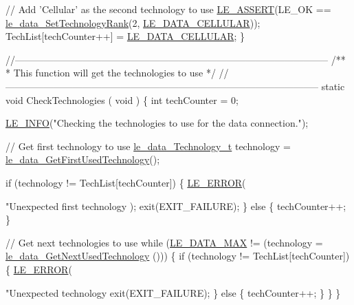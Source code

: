 \begin{DoxyCodeInclude}
{    \textcolor{comment}{// Add 'Cellular' as the second technology to use}
    \hyperlink{le__log_8h_ac0dbbef91dc0fed449d0092ff0557b39}{LE\_ASSERT}(LE\_OK == \hyperlink{le__data__interface_8h_aeb5f71861d30b8442b2c11ca34bc73c4}{le\_data\_SetTechnologyRank}(2, 
      \hyperlink{le__data__interface_8h_a245d12b4d3367d81c0fc8b76fa60674aaaa3c712c673bf5a353beba020c415a5f}{LE\_DATA\_CELLULAR}));
    TechList[techCounter++] = \hyperlink{le__data__interface_8h_a245d12b4d3367d81c0fc8b76fa60674aaaa3c712c673bf5a353beba020c415a5f}{LE\_DATA\_CELLULAR};
\}

\textcolor{comment}{//--------------------------------------------------------------------------------------------------}\textcolor{comment}{}
\textcolor{comment}{/**}
\textcolor{comment}{ *  This function will get the technologies to use}
\textcolor{comment}{ */}
\textcolor{comment}{//--------------------------------------------------------------------------------------------------}
\textcolor{keyword}{static} \textcolor{keywordtype}{void} CheckTechnologies
(
    \textcolor{keywordtype}{void}
)
\{
    \textcolor{keywordtype}{int} techCounter = 0;

    \hyperlink{le__log_8h_a23e6d206faa64f612045d688cdde5808}{LE\_INFO}(\textcolor{stringliteral}{"Checking the technologies to use for the data connection."});

    \textcolor{comment}{// Get first technology to use}
    \hyperlink{le__data__interface_8h_a245d12b4d3367d81c0fc8b76fa60674a}{le\_data\_Technology\_t} technology = 
      \hyperlink{le__data__interface_8h_affc9e22694ddee1141983129f6e29837}{le\_data\_GetFirstUsedTechnology}();

    \textcolor{keywordflow}{if} (technology != TechList[techCounter])
    \{
        \hyperlink{le__log_8h_a353590f91b3143a7ba3a416ae5a50c3d}{LE\_ERROR}(\textcolor{stringliteral}{"Unexpected first technology %
      );
        exit(EXIT\_FAILURE);
    \}
    \textcolor{keywordflow}{else}
    \{
        techCounter++;
    \}

    \textcolor{comment}{// Get next technologies to use}
    \textcolor{keywordflow}{while} (\hyperlink{le__data__interface_8h_a245d12b4d3367d81c0fc8b76fa60674aa5143acc7e16842ac4cf33afa34b50c0b}{LE\_DATA\_MAX} != (technology = \hyperlink{le__data__interface_8h_af262685afd895d084e9ee485de514264}{le\_data\_GetNextUsedTechnology}
      ()))
    \{
        \textcolor{keywordflow}{if} (technology != TechList[techCounter])
        \{
            \hyperlink{le__log_8h_a353590f91b3143a7ba3a416ae5a50c3d}{LE\_ERROR}(\textcolor{stringliteral}{"Unexpected technology %
            exit(EXIT\_FAILURE);
        \}
        \textcolor{keywordflow}{else}
        \{
            techCounter++;
        \}
    \}
\}

}}}
\end{DoxyCodeInclude}
